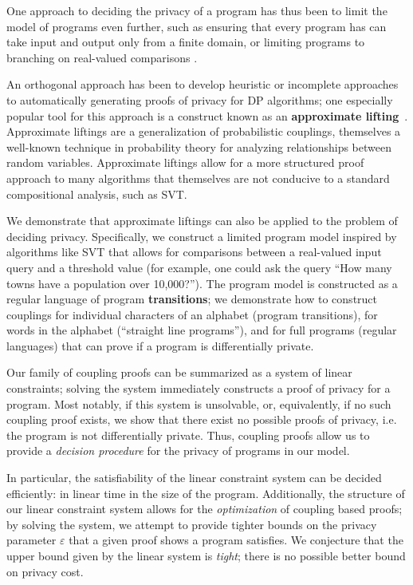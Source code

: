 One approach to deciding the privacy of a program has thus been to limit the model of programs even further, such as ensuring that every program has can take input and output only from a finite domain, or limiting programs to branching on real-valued comparisons \cite{bartheDecidingDifferentialPrivacy2020,chadhaLinearTimeDecidability2021,chadhaDecidingDifferentialPrivacy2023}.

An orthogonal approach has been to develop heuristic or incomplete approaches to automatically generating proofs of privacy for DP algorithms; one especially popular tool for this approach is a construct known as an 
\textbf{approximate lifting}~\cite{bartheProvingDifferentialPrivacy2016,bartheDifferentialPrivacyComposition2013,hsuProbabilisticCouplingsProbabilistic2017,albarghouthiConstraintBasedSynthesisCoupling2018,albarghouthiSynthesizingCouplingProofs2017}. 
Approximate liftings are a generalization of probabilistic couplings, themselves a well-known technique in probability theory for analyzing relationships between random variables.
Approximate liftings allow for a more structured proof approach to many algorithms that themselves are not conducive to a standard compositional analysis, such as SVT.

We demonstrate that approximate liftings can also be applied to the problem of deciding privacy. Specifically, we construct a limited program model inspired by algorithms like SVT that allows for comparisons between a real-valued input query and a threshold value (for example, one could ask the query ``How many towns have a population over 10,000?'').
The program model is constructed as a regular language of program \textbf{transitions}; we demonstrate how to construct couplings for individual characters of an alphabet (program transitions), for words in the alphabet (``straight line programs''), and for full programs (regular languages) that can prove if a program is differentially private. 

Our family of coupling proofs can be summarized as a system of linear constraints; solving the system immediately constructs a proof of privacy for a program. Most notably, if this system is unsolvable, or, equivalently, if no such coupling proof exists, we show that there exist no possible proofs of privacy, i.e. the program is not differentially private. Thus, coupling proofs allow us to provide a \textit{decision procedure} for the privacy of programs in our model. 

In particular, the satisfiability of the linear constraint system can be decided efficiently: in linear time in the size of the program. Additionally, the structure of our linear constraint system allows for the \textit{optimization} of coupling based proofs; by solving the system, we attempt to provide tighter bounds on the privacy parameter $\varepsilon$ that a given proof shows a program satisfies. 
We conjecture that the upper bound given by the linear system is \textit{tight}; there is no possible better bound on privacy cost. 

